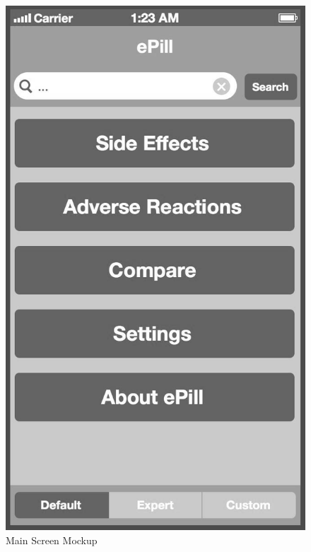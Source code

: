 \begin{figure}[ptbh]
    \begin{minipage}[b]{0.45\linewidth}
        \centering
        \includegraphics[width=0.8025\linewidth]{figures/Screen_1_bw.jpg}
        \caption[Main Screen Mockup]{Main Screen Mockup}
        \label{fig:Mockup}
    \end{minipage}
    \hspace{0.5cm}
    \begin{minipage}[b]{0.45\linewidth}
        \centering

\end{minipage}
\end{figure}
